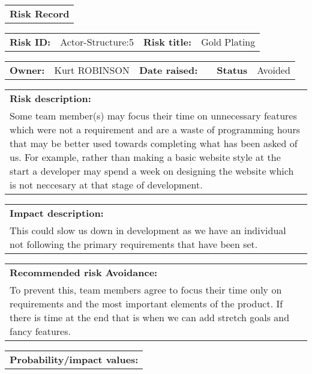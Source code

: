 \begin{table}
	\begin{tabularx}{\textwidth}{| X |}
		\hline
		\textbf{Risk Record} \\
	\end{tabularx}
	\begin{tabularx}{\textwidth}{| l | X | l | X |}
		\hline
		\textbf{Risk ID:} & Actor-Structure:5 & \textbf{Risk title:} & Gold Plating \\
	\end{tabularx}
	\begin{tabularx}{\textwidth}{| l | X | l | X | l | X |}
		\hline
		\textbf{Owner:} & Kurt ROBINSON & \textbf{Date raised:} &  & \textbf{Status} & Avoided \\
	\end{tabularx}
	\begin{tabularx}{\textwidth}{| X |}
		\hline
		\textbf{Risk description:} \\ Some team member(s) may focus their time on unnecessary features which were not a requirement and are a waste of programming hours that may be better used towards completing what has been asked of us. For example, rather than making a basic website style at the start a developer may spend a week on designing the website which is not neccesary at that stage of development.  \\
	\end{tabularx}
	\begin{tabularx}{\textwidth}{| X |}
		\hline
		\textbf{Impact description:} \\ This could slow us down in development as we have an individual not following the primary requirements that have been set. \\
	\end{tabularx}
	\begin{tabularx}{\textwidth}{| X |}
		\hline
		\textbf{Recommended risk Avoidance:} \\ To prevent this, team members agree to focus their time only on requirements and the most important elements of the product. If there is time at the end that is when we can add stretch goals and fancy features. \\
	\end{tabularx}
	\begin{tabularx}{\textwidth}{| X |}
		\hline
		\textbf{Probability/impact values:} \\
	\end{tabularx}
	\begin{tabularx}{\textwidth}{| l | l | X | X | X |}

\end{tabularx}
\end{table}
